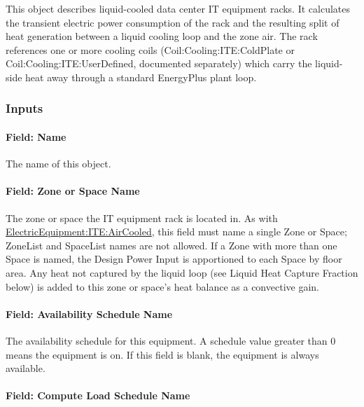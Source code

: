 This object describes liquid-cooled data center IT equipment racks. It calculates the transient electric power consumption of the rack and the resulting split of heat generation between a liquid cooling loop and the zone air. The rack references one or more cooling coils (Coil:Cooling:ITE:ColdPlate or Coil:Cooling:ITE:UserDefined, documented separately) which carry the liquid-side heat away through a standard EnergyPlus plant loop.

\subsubsection{Inputs}\label{inputs-iteliquidcooled}

\paragraph{Field: Name}\label{field-name-iteliquidcooled}

The name of this object.

\paragraph{Field: Zone or Space Name}\label{field-zone-or-space-name-iteliquidcooled}

The zone or space the IT equipment rack is located in. As with \hyperref[electricequipmentiteaircooled]{ElectricEquipment:ITE:AirCooled}, this field must name a single Zone or Space; ZoneList and SpaceList names are not allowed. If a Zone with more than one Space is named, the Design Power Input is apportioned to each Space by floor area. Any heat not captured by the liquid loop (see Liquid Heat Capture Fraction below) is added to this zone or space's heat balance as a convective gain.

\paragraph{Field: Availability Schedule Name}\label{field-availability-schedule-name-iteliquidcooled}

The availability schedule for this equipment. A schedule value greater than 0 means the equipment is on. If this field is blank, the equipment is always available.

\paragraph{Field: Compute Load Schedule Name}\label{field-compute-load-schedule-name-iteliquidcooled}

